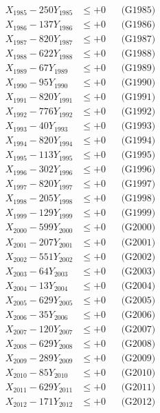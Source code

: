 \documentclass[a4paper,10pt]{article}
\begin{document}
{\begin{align}
X_{1985} - 250Y_{1985} &\leq +0 && \text{(G1985)} \\
X_{1986} - 137Y_{1986} &\leq +0 && \text{(G1986)} \\
X_{1987} - 820Y_{1987} &\leq +0 && \text{(G1987)} \\
X_{1988} - 622Y_{1988} &\leq +0 && \text{(G1988)} \\
X_{1989} - 67Y_{1989} &\leq +0 && \text{(G1989)} \\
X_{1990} - 95Y_{1990} &\leq +0 && \text{(G1990)} \\
\allowbreak
X_{1991} - 820Y_{1991} &\leq +0 && \text{(G1991)} \\
X_{1992} - 776Y_{1992} &\leq +0 && \text{(G1992)} \\
X_{1993} - 40Y_{1993} &\leq +0 && \text{(G1993)} \\
X_{1994} - 820Y_{1994} &\leq +0 && \text{(G1994)} \\
X_{1995} - 113Y_{1995} &\leq +0 && \text{(G1995)} \\
X_{1996} - 302Y_{1996} &\leq +0 && \text{(G1996)} \\
X_{1997} - 820Y_{1997} &\leq +0 && \text{(G1997)} \\
X_{1998} - 205Y_{1998} &\leq +0 && \text{(G1998)} \\
X_{1999} - 129Y_{1999} &\leq +0 && \text{(G1999)} \\
X_{2000} - 599Y_{2000} &\leq +0 && \text{(G2000)} \\
\allowbreak
X_{2001} - 207Y_{2001} &\leq +0 && \text{(G2001)} \\
X_{2002} - 551Y_{2002} &\leq +0 && \text{(G2002)} \\
X_{2003} - 64Y_{2003} &\leq +0 && \text{(G2003)} \\
X_{2004} - 13Y_{2004} &\leq +0 && \text{(G2004)} \\
X_{2005} - 629Y_{2005} &\leq +0 && \text{(G2005)} \\
X_{2006} - 35Y_{2006} &\leq +0 && \text{(G2006)} \\
X_{2007} - 120Y_{2007} &\leq +0 && \text{(G2007)} \\
X_{2008} - 629Y_{2008} &\leq +0 && \text{(G2008)} \\
X_{2009} - 289Y_{2009} &\leq +0 && \text{(G2009)} \\
X_{2010} - 85Y_{2010} &\leq +0 && \text{(G2010)} \\
\allowbreak
X_{2011} - 629Y_{2011} &\leq +0 && \text{(G2011)} \\
X_{2012} - 171Y_{2012} &\leq +0 && \text{(G2012)} \\

\end{align}}
\end{document}
